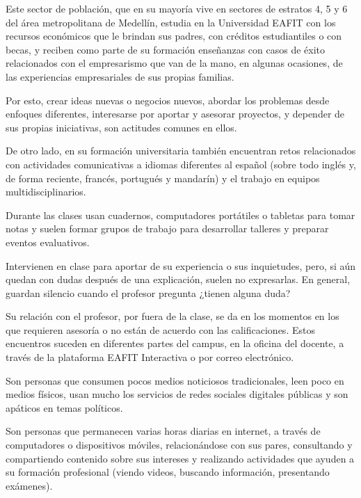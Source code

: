 \documentclass[twoside,letterpaper,12pt]{report}
\begin{document}
Este sector de población, que en su mayoría vive en sectores de estratos 4, 5 y 6 del área metropolitana de Medellín, estudia en la Universidad EAFIT con los recursos económicos que le brindan sus padres, con créditos estudiantiles o con becas, y reciben como parte de su formación enseñanzas con casos de éxito relacionados con el empresarismo que van de la mano, en algunas ocasiones, de las experiencias empresariales de sus propias familias.

Por esto, crear ideas nuevas o negocios nuevos, abordar los problemas desde enfoques diferentes, interesarse por aportar y asesorar proyectos, y depender de sus propias iniciativas, son actitudes comunes en ellos.

De otro lado, en su formación universitaria también encuentran retos relacionados con actividades comunicativas a idiomas diferentes al español (sobre todo inglés y, de forma reciente, francés, portugués y mandarín) y el trabajo en equipos multidisciplinarios.

Durante las clases usan cuadernos, computadores portátiles o tabletas para tomar notas y suelen formar grupos de trabajo para desarrollar talleres y preparar eventos evaluativos. 

Intervienen en clase para aportar de su experiencia o sus inquietudes, pero, si aún quedan con dudas después de una explicación, suelen no expresarlas. En general, guardan silencio cuando el profesor pregunta ¿tienen alguna duda?

Su relación con el profesor, por fuera de la clase, se da en los momentos en los que requieren asesoría o no están de acuerdo con las calificaciones. Estos encuentros suceden en diferentes partes del campus, en la oficina del docente, a través de la plataforma EAFIT Interactiva o por correo electrónico. 

Son personas que consumen pocos medios noticiosos tradicionales, leen poco en medios físicos, usan mucho los servicios de redes sociales digitales públicas y son apáticos en temas políticos.

Son personas que permanecen varias horas diarias en internet, a través de computadores o dispositivos móviles, relacionándose con sus pares, consultando y compartiendo contenido sobre sus intereses y realizando actividades que ayuden a su formación profesional (viendo videos, buscando información, presentando exámenes).

\newpage

\end{document}
